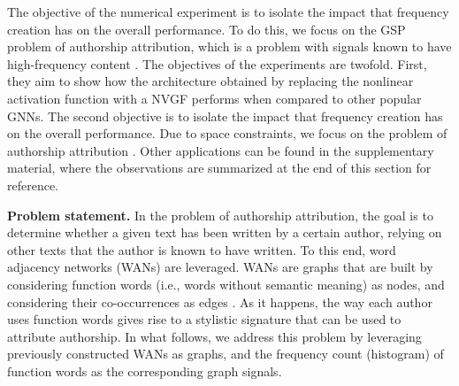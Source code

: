 

The objective of the numerical experiment is to isolate the impact that frequency creation has on the overall performance. To do this, we focus on the GSP problem of authorship attribution, which is a problem with signals known to have high-frequency content \cite{Segarra2015-Authorship}.
\else
The objectives of the experiments are twofold. First, they aim to show how the architecture obtained by replacing the nonlinear activation function with a NVGF performs when compared to other popular GNNs. The second objective is to isolate the impact that frequency creation has on the overall performance. Due to space constraints, we focus on the problem of authorship attribution \cite{Segarra2015-Authorship}. Other applications can be found in the supplementary material, where the observations are summarized at the end of this section for reference.
\fi

\textbf{Problem statement.} In the problem of authorship attribution, the goal is to determine whether a given text has been written by a certain author, relying on other texts that the author is known to have written. To this end, word adjacency networks (WANs) are leveraged. WANs are graphs that are built by considering function words (i.e., words without semantic meaning) as nodes, and considering their co-occurrences as edges \cite{Segarra2015-Authorship}. As it happens, the way each author uses function words gives rise to a stylistic signature that can be used to attribute authorship. In what follows, we address this problem by leveraging previously constructed WANs as graphs, and the frequency count (histogram) of function words as the corresponding graph signals.

